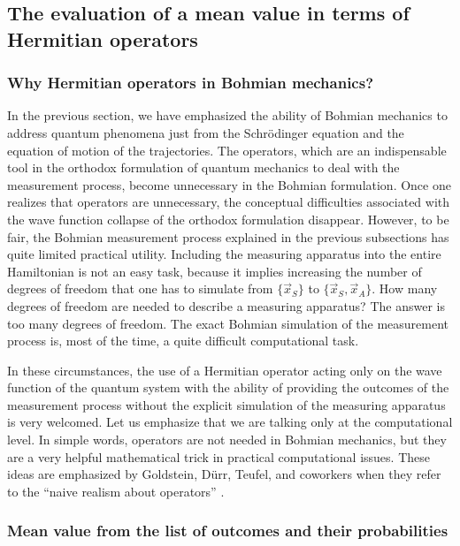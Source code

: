 \documentclass[onecolumn,nofootinbib, secnumarabic, amsmath, nobibnotes,11pt,aps,pra]{revtex4-1}
\begin{document}
\subsection{The evaluation of a mean value in terms of Hermitian operators}
\label{om.sec_measurement.2}


\subsubsection{Why Hermitian operators in Bohmian mechanics?}

In the previous section, we have emphasized the ability of Bohmian
mechanics to address quantum phenomena just from the
Schr\"odinger equation and the equation of motion of the
trajectories. The operators, which are an indispensable tool in the
orthodox formulation of quantum mechanics to deal with  the measurement
process, become unnecessary in the Bohmian formulation. Once one
realizes that operators are unnecessary, the conceptual difficulties
associated with the wave function collapse of the orthodox
formulation disappear. However, to be fair, the Bohmian measurement
process explained in the previous subsections has quite limited
practical utility. Including the measuring apparatus into the entire
Hamiltonian is not an easy task, because it implies increasing the
number of degrees of freedom that one has to simulate from $\{\vec
x_S\}$ to $\{\vec x_S,\vec x_A\}$. How many degrees of freedom are
needed to describe a measuring apparatus? The answer is too many
degrees of freedom. The exact Bohmian simulation of the measurement
process is, most of the time, a quite difficult computational task.

In these circumstances, the use of a Hermitian operator acting only
on the wave function of the quantum system with the ability of
providing the outcomes of the measurement process without the
explicit simulation of the measuring apparatus is very welcomed. Let
us emphasize that we are talking only at the computational level. In
simple words, operators are not needed in Bohmian mechanics, but
they are a very helpful mathematical trick in practical
computational issues. These ideas are emphasized by Goldstein,
D\"{u}rr, Teufel, and coworkers when they refer to the ``naive
realism about operators'' \cite{om.Durrnaive,om.Durrllibre,om.goldstein}.


\subsubsection{Mean value from the list of outcomes and their probabilities}
\end{document}
